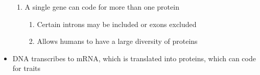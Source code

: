 \documentclass[12pt]{article}
\begin{document}
\begin{itemize}
\begin{enumerate}
    \item A single gene can code for more than one protein

      \begin{enumerate}

        \item Certain introns may be included or exons excluded

        \item Allows humans to have a large diversity of proteins

      \end{enumerate}

  \end{enumerate}

\item DNA transcribes to mRNA, which is translated into proteins, which can code for traits

\end{itemize}
\end{document}
